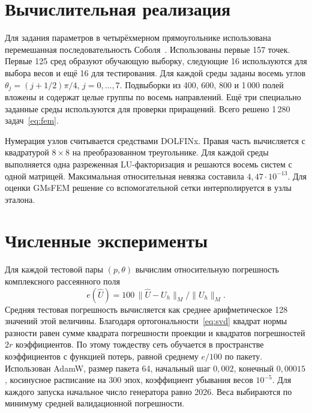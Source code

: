 \documentclass[11pt,a4paper]{article}
\newcommand{\norm}[1]{\lVert #1\rVert}
\begin{document}
\section{Вычислительная реализация}
Для задания параметров в четырёхмерном прямоугольнике использована перемешанная последовательность Соболя~\cite{sobol}. Использованы первые 157 точек. Первые 125 сред образуют обучающую выборку, следующие 16 используются для выбора весов и ещё 16 для тестирования. Для каждой среды заданы восемь углов $\theta_j=(j+1/2)\pi/4$, $j=0,\ldots,7$. Подвыборки из 400, 600, 800 и 1\,000 полей вложены и содержат целые группы по восемь направлений. Ещё три специально заданные среды используются для проверки приращений. Всего решено 1\,280 задач~\eqref{eq:fem}.

Нумерация узлов считывается средствами DOLFINx. Правая часть вычисляется с квадратурой $8\times8$ на преобразованном треугольнике. Для каждой среды выполняется одна разреженная LU-факторизация и решаются восемь систем с одной матрицей. Максимальная относительная невязка составила $4{,}47\cdot10^{-13}$. Для оценки GMsFEM решение со вспомогательной сетки интерполируется в узлы эталона.

\clearpage
\section{Численные эксперименты}
Для каждой тестовой пары $(p,\theta)$ вычислим относительную погрешность комплексного рассеянного поля
\begin{equation}
 e(\widehat U)=100\,\norm{\widehat U-U_h}_M/\norm{U_h}_M .
 \label{eq:error}
\end{equation}
Средняя тестовая погрешность вычисляется как среднее арифметическое 128 значений этой величины. Благодаря ортогональности~\eqref{eq:svd} квадрат нормы разности равен сумме квадрата погрешности проекции и квадратов погрешностей $2r$ коэффициентов. По этому тождеству сеть обучается в пространстве коэффициентов с функцией потерь, равной среднему $e/100$ по пакету. Использован AdamW, размер пакета 64, начальный шаг $0{,}002$, конечный $0{,}00015$, косинусное расписание на 300 эпох, коэффициент убывания весов $10^{-5}$. Для каждого запуска начальное число генератора равно 2026. Веса выбираются по минимуму средней валидационной погрешности.
\end{document}
